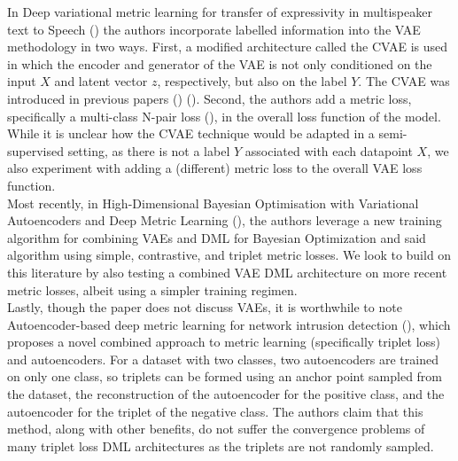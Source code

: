 \documentclass[./dissertation.tex]{subfiles}
\begin{document}
In Deep variational metric learning for transfer of expressivity in multispeaker text to Speech (\cite{kulkarni2020deep}) the authors incorporate labelled information into the VAE methodology in two ways. First, a modified architecture called the CVAE is used in which the encoder and generator of the VAE is not only conditioned on the input $X$ and latent vector $z$, respectively, but also on the label $Y$. The CVAE was introduced in previous papers (\cite{sohn2015learning}) (\cite{dahmani2019conditional}). Second, the authors add a metric loss, specifically a multi-class N-pair loss (\cite{sohn2016improved}), in the overall loss function of the model. While it is unclear how the CVAE technique would be adapted in a semi-supervised setting, as there is not a label $Y$ associated with each datapoint $X$, we also experiment with adding a (different) metric loss to the overall VAE loss function. \\
    
Most recently, in High-Dimensional Bayesian Optimisation with Variational Autoencoders and Deep Metric Learning (\cite{grosnit2021high}), the authors leverage a new training algorithm for combining VAEs and DML for Bayesian Optimization and said algorithm using simple, contrastive, and triplet metric losses. We look to build on this literature by also testing a combined VAE DML architecture on more recent metric losses, albeit using a simpler training regimen. \\

Lastly, though the paper does not discuss VAEs, it is worthwhile to note Autoencoder-based deep metric learning for network intrusion detection (\cite{ANDRESINI2021706}), which proposes a novel combined approach to metric learning (specifically triplet loss) and autoencoders. For a dataset with two classes, two autoencoders are trained on only one class, so triplets can be formed using an anchor point sampled from the dataset, the reconstruction of the autoencoder for the positive class, and the autoencoder for the triplet of the negative class. The authors claim that this method, along with other benefits, do not suffer the convergence problems of many triplet loss DML architectures as the triplets are not randomly sampled.
\end{document}
